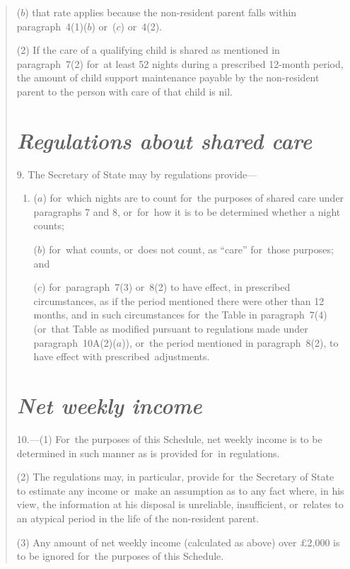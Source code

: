 \documentclass[12pt,a4paper]{article}
\begin{document}
\begin{quotation}
\begin{enumerate}
($b$) that rate applies because the non-resident parent falls within paragraph~4(1)($b$)  or~($c$)  or~4(2).
\end{enumerate}

(2) If the care of a qualifying child is shared as mentioned in paragraph~7(2)  for~at least 52 nights during a prescribed 12-month period, the amount of child support maintenance payable by the non-resident parent to the person with care of that child is nil.

\section*{\itshape Regulations about shared care}

9. The Secretary of State may by regulations provide—
\begin{enumerate}\item[]
($a$) for~which nights are to count for~the purposes of shared care under paragraphs 7 and 8, or~for~how it is to be determined whether a night counts;

($b$) for~what counts, or~does not count, as “care” for~those purposes; and

($c$) for~paragraph~7(3)  or~8(2)  to have effect, in prescribed circumstances, as if the period mentioned there were other than 12 months, and in such circumstances for~the Table in paragraph~7(4)  (or~that Table as modified pursuant to regulations made under paragraph~10A(2)($a$)), or~the period mentioned in paragraph~8(2), to have effect with prescribed~adjustments.
\end{enumerate}

\section*{\itshape Net weekly income}

10.---(1) For~the purposes of this Schedule, net weekly income is to be determined in such manner as is provided for~in regulations.

(2) The regulations may, in particular, provide for~the Secretary of State to estimate any income or~make an assumption as to any fact where, in his view, the information at his disposal is unreliable, insufficient, or~relates to an atypical period in the life of the non-resident parent.

(3) Any amount of net weekly income (calculated as above) over £2,000 is to be ignored for~the purposes of this Schedule.


\end{quotation}
\end{document}
